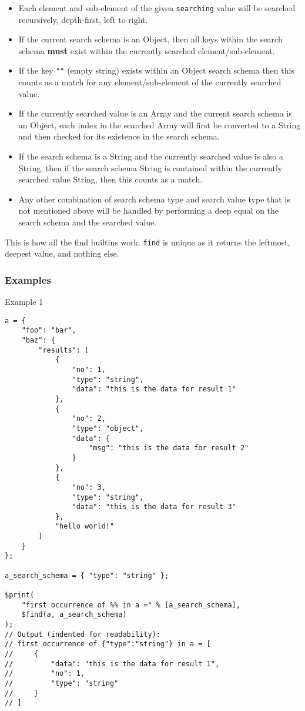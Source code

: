 \begin{itemize}
    \item Each element and sub-element of the given \verb|searching| value will be searched recursively, depth-first, left to right.
    \item If the current search schema is an Object, then all keys within the search schema \textbf{must} exist within the currently searched element/sub-element.
    \item If the key \verb|""| (empty string) exists within an Object search schema then this counts as a match for any element/sub-element of the currently searched value.
    \item If the currently searched value is an Array and the current search schema is an Object, each index in the searched Array will first be converted to a String and then checked for its existence in the search schema.
    \item If the search schema is a String and the currently searched value is also a String, then if the search schema String is contained within the currently searched value String, then this counts as a match.
    \item Any other combination of search schema type and search value type that is not mentioned above will be handled by performing a deep equal on the search schema and the searched value.
\end{itemize}

This is how all the find builtins work. \verb|find| is unique as it returns the leftmost, deepest value, and nothing else.

\subsubsection{Examples}

\begin{center}
    Example 1
\begin{verbatim}
a = {
    "foo": "bar",
    "baz": {
        "results": [
            {
                "no": 1,
                "type": "string",
                "data": "this is the data for result 1"
            },
            {
                "no": 2,
                "type": "object",
                "data": {
                    "msg": "this is the data for result 2"
                }
            },
            {
                "no": 3,
                "type": "string",
                "data": "this is the data for result 3"
            },
            "hello world!"
        ]
    }
};

a_search_schema = { "type": "string" };

$print(
    "first occurrence of %% in a =" % [a_search_schema],
    $find(a, a_search_schema)
);
// Output (indented for readability):
// first occurrence of {"type":"string"} in a = [
//     {
//         "data": "this is the data for result 1",
//         "no": 1,
//         "type": "string"
//     }
// ]
\end{verbatim}
\end{center}

